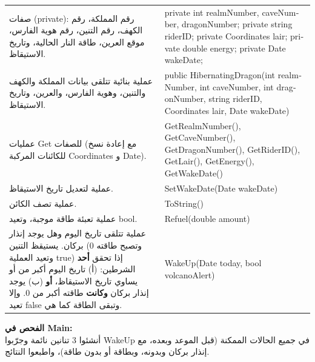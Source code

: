 \documentclass[14pt]{extarticle}
\begin{document}
\begin{enumerate}[label=\textbf{تمرين \arabic*:}, wide=0pt, leftmargin=*, itemsep=2.2em]
    {\centering
    \renewcommand{\arraystretch}{1.2}
    \small
    \begin{tabular}{|>{\raggedleft\arraybackslash}p{}|>{\raggedright\arraybackslash}p{}|}
    \hline
    \multicolumn{2}{|c|}{\textbf{الفئة: \textenglish{HibernatingDragon}}} \\
    \hline
    صفات (\textenglish{private}): رقم المملكة، رقم الكهف، رقم التنين، رقم هوية الفارس، موقع العرين، طاقة النار الحالية، وتاريخ الاستيقاظ. & \textenglish{private int realmNumber, caveNumber, dragonNumber;} \newline \textenglish{private string riderID;} \newline \textenglish{private Coordinates lair;} \newline \textenglish{private double energy;} \newline \textenglish{private Date wakeDate;} \\
    \hline
    عملية بنائية تتلقى بيانات المملكة والكهف والتنين، وهوية الفارس، والعرين، وتاريخ الاستيقاظ. & \textenglish{public HibernatingDragon(int realmNumber, int caveNumber, int dragonNumber, string riderID, Coordinates lair, Date wakeDate)} \\
    \hline
    عمليات \textenglish{Get} للصفات (مع إعادة نسخ للكائنات المركبة \textenglish{Coordinates} و \textenglish{Date}). & \textenglish{GetRealmNumber(), GetCaveNumber(), GetDragonNumber(), GetRiderID(), GetLair(), GetEnergy(), GetWakeDate()} \\
    \hline
    عملية لتعديل تاريخ الاستيقاظ. & \textenglish{SetWakeDate(Date wakeDate)} \\
    \hline
    عملية تصف الكائن. & \textenglish{ToString()} \\
    \hline
    عملية تعبئة طاقة موجبة، وتعيد \textenglish{bool}. & \textenglish{Refuel(double amount)} \\
    \hline
    عملية تتلقى تاريخ اليوم وهل يوجد إنذار بركان. يستيقظ التنين (وتصبح طاقته $0$ وتعيد العملية \textenglish{true}) إذا تحقق \textbf{أحد} الشرطين: (أ) تاريخ اليوم أكبر من أو يساوي تاريخ الاستيقاظ، \textbf{أو} (ب) يوجد إنذار بركان \textbf{وكانت} طاقته أكبر من $0$. وإلا تعيد \textenglish{false} وتبقى الطاقة كما هي. & \textenglish{WakeUp(Date today, bool volcanoAlert)} \\
    \hline
    \end{tabular}
    \par} %

    \vspace{2em}
    \noindent \textbf{الفحص في \textenglish{Main}:} \\
    أنشئوا 3 تنانين نائمة وجرّبوا \textenglish{WakeUp} في جميع الحالات الممكنة (قبل الموعد وبعده، مع إنذار بركان وبدونه، وبطاقة أو بدون طاقة)، واطبعوا النتائج.


\end{enumerate}
\end{document}
